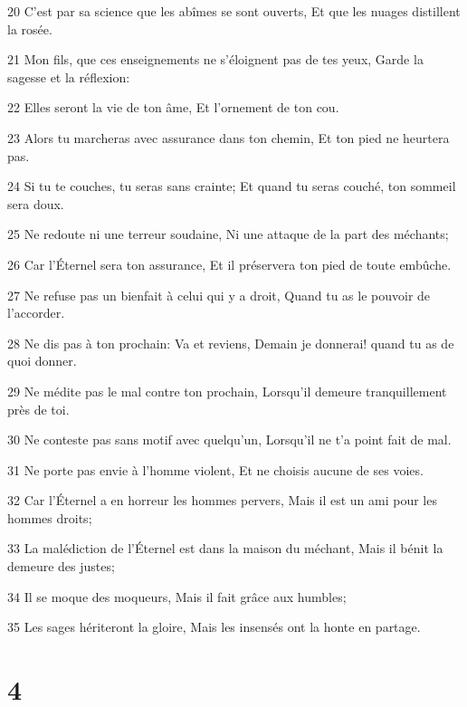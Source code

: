 \par 20 C'est par sa science que les abîmes se sont ouverts, Et que les nuages distillent la rosée.
\par 21 Mon fils, que ces enseignements ne s'éloignent pas de tes yeux, Garde la sagesse et la réflexion:
\par 22 Elles seront la vie de ton âme, Et l'ornement de ton cou.
\par 23 Alors tu marcheras avec assurance dans ton chemin, Et ton pied ne heurtera pas.
\par 24 Si tu te couches, tu seras sans crainte; Et quand tu seras couché, ton sommeil sera doux.
\par 25 Ne redoute ni une terreur soudaine, Ni une attaque de la part des méchants;
\par 26 Car l'Éternel sera ton assurance, Et il préservera ton pied de toute embûche.
\par 27 Ne refuse pas un bienfait à celui qui y a droit, Quand tu as le pouvoir de l'accorder.
\par 28 Ne dis pas à ton prochain: Va et reviens, Demain je donnerai! quand tu as de quoi donner.
\par 29 Ne médite pas le mal contre ton prochain, Lorsqu'il demeure tranquillement près de toi.
\par 30 Ne conteste pas sans motif avec quelqu'un, Lorsqu'il ne t'a point fait de mal.
\par 31 Ne porte pas envie à l'homme violent, Et ne choisis aucune de ses voies.
\par 32 Car l'Éternel a en horreur les hommes pervers, Mais il est un ami pour les hommes droits;
\par 33 La malédiction de l'Éternel est dans la maison du méchant, Mais il bénit la demeure des justes;
\par 34 Il se moque des moqueurs, Mais il fait grâce aux humbles;
\par 35 Les sages hériteront la gloire, Mais les insensés ont la honte en partage.

\chapter{4}

